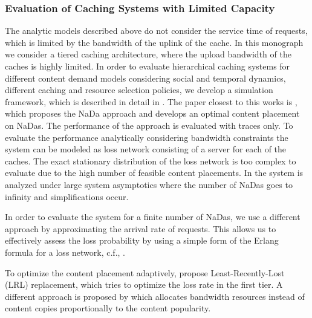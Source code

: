 \subsubsection{Evaluation of Caching Systems with Limited Capacity}

The analytic models described above do not consider the service time of requests, which is limited by the bandwidth of the uplink of the cache.
In this monograph we consider a tiered caching architecture, where the upload bandwidth of the caches is highly limited.
In order to evaluate hierarchical caching systems for different content demand models considering social and temporal dynamics, different caching and resource selection policies, we develop a simulation framework, which is described in detail in .
The paper closest to this works is \cite{valancius2009greening}, which proposes the NaDa approach and develops an optimal content placement on NaDas.
The performance of the approach is evaluated with traces only.
To evaluate the performance analytically considering bandwidth constraints the system can be modeled as loss network consisting of a server for each of the caches.
The exact stationary distribution of the loss network is too complex to evaluate due to the high number of feasible content placements.
In \cite{tan2013optimal} the system is analyzed under large system asymptotics where the number of NaDas goes to infinity and simplifications occur.

In order to evaluate the system for a finite number of NaDas, we use a different approach by approximating the arrival rate of requests.
This allows us to effectively assess the loss probability by using a simple form of the Erlang formula for a loss network, c.f., .

To optimize the content placement adaptively, \cite{leconte2014adaptive} propose Least-Recently-Lost (LRL) replacement, which tries to optimize the loss rate in the first tier.
A different approach is proposed by \cite{zhou2015unifying} which allocates bandwidth resources instead of content copies proportionally to the content popularity.
